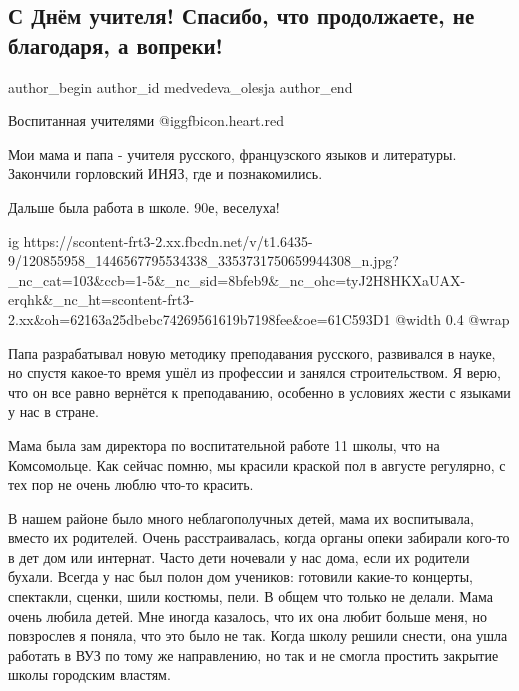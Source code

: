  
 
 
 
 
 
\subsection{С Днём учителя! Спасибо, что продолжаете, не благодаря, а вопреки!}
\label{sec:04_10_2020.fb.medvedeva_olesja.1.s_dnem_uchitelja}
 
\ifcmt
 author_begin
   author_id medvedeva_olesja
 author_end
\fi

Воспитанная учителями @igg{fbicon.heart.red}

Мои мама и папа - учителя русского, французского языков и литературы. Закончили
горловский ИНЯЗ, где и познакомились. 

Дальше была работа в школе. 90е, веселуха!

\ifcmt
  ig https://scontent-frt3-2.xx.fbcdn.net/v/t1.6435-9/120855958_1446567795534338_3353731750659944308_n.jpg?_nc_cat=103&ccb=1-5&_nc_sid=8bfeb9&_nc_ohc=tyJ2H8HKXaUAX-erqhk&_nc_ht=scontent-frt3-2.xx&oh=62163a25dbebc74269561619b7198fee&oe=61C593D1
  @width 0.4
  @wrap 
\fi

Папа разрабатывал новую методику преподавания русского, развивался в науке, но
спустя какое-то время ушёл из профессии и занялся строительством. Я верю, что
он все равно вернётся к преподаванию, особенно в условиях жести с языками у нас
в стране.

Мама была зам директора по воспитательной работе 11 школы, что на Комсомольце.
Как сейчас помню, мы красили краской пол в августе регулярно, с тех пор не
очень люблю что-то красить. 

В нашем районе было много неблагополучных детей, мама их воспитывала, вместо их
родителей. Очень расстраивалась, когда органы опеки забирали кого-то в дет дом
или интернат. Часто дети ночевали у нас дома, если их родители бухали. Всегда у
нас был полон дом учеников: готовили какие-то концерты, спектакли, сценки, шили
костюмы, пели. В общем что только не делали. Мама очень любила детей. Мне
иногда казалось, что их она любит больше меня, но повзрослев я поняла, что это
было не так. Когда школу решили снести, она ушла работать в ВУЗ по тому же
направлению, но так и не смогла простить закрытие школы городским властям. 

